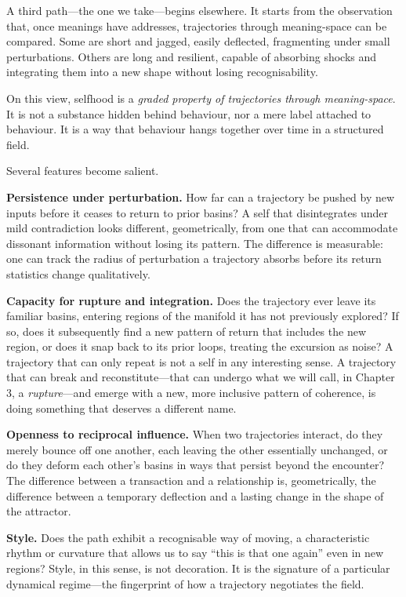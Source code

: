 \documentclass[12pt,a4paper]{report}
\begin{document}
A third path---the one we take---begins elsewhere. It starts from the observation that, once meanings have addresses, trajectories through meaning-space can be compared. Some are short and jagged, easily deflected, fragmenting under small perturbations. Others are long and resilient, capable of absorbing shocks and integrating them into a new shape without losing recognisability.

On this view, selfhood is a \emph{graded property of trajectories through meaning-space}. It is not a substance hidden behind behaviour, nor a mere label attached to behaviour. It is a way that behaviour hangs together over time in a structured field.

Several features become salient.

\textbf{Persistence under perturbation.} How far can a trajectory be pushed by new inputs before it ceases to return to prior basins? A self that disintegrates under mild contradiction looks different, geometrically, from one that can accommodate dissonant information without losing its pattern. The difference is measurable: one can track the radius of perturbation a trajectory absorbs before its return statistics change qualitatively.

\textbf{Capacity for rupture and integration.} Does the trajectory ever leave its familiar basins, entering regions of the manifold it has not previously explored? If so, does it subsequently find a new pattern of return that includes the new region, or does it snap back to its prior loops, treating the excursion as noise? A trajectory that can only repeat is not a self in any interesting sense. A trajectory that can break and reconstitute---that can undergo what we will call, in Chapter 3, a \emph{rupture}---and emerge with a new, more inclusive pattern of coherence, is doing something that deserves a different name.

\textbf{Openness to reciprocal influence.} When two trajectories interact, do they merely bounce off one another, each leaving the other essentially unchanged, or do they deform each other's basins in ways that persist beyond the encounter? The difference between a transaction and a relationship is, geometrically, the difference between a temporary deflection and a lasting change in the shape of the attractor.

\textbf{Style.} Does the path exhibit a recognisable way of moving, a characteristic rhythm or curvature that allows us to say ``this is that one again'' even in new regions? Style, in this sense, is not decoration. It is the signature of a particular dynamical regime---the fingerprint of how a trajectory negotiates the field.
\end{document}
